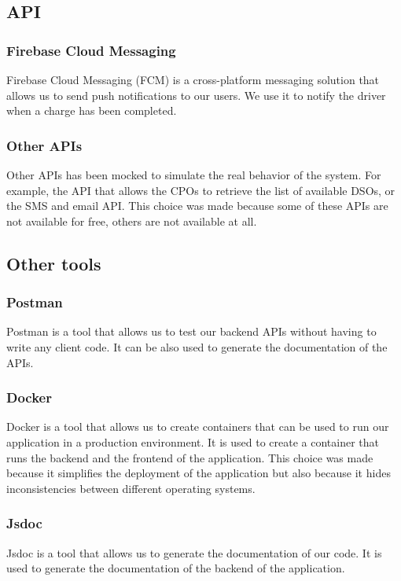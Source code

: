 \subsection{API}
\subsubsection{Firebase Cloud Messaging}
Firebase Cloud Messaging (FCM) is a cross-platform messaging solution that allows us to send push notifications to our users. We use it to notify the driver when a charge has been completed.

\subsubsection{Other APIs}
Other APIs has been mocked to simulate the real behavior of the system. For example, the API that allows the CPOs to retrieve the list of available DSOs, or the SMS and email API.
This choice was made because some of these APIs are not available for free, others are not available at all.

\subsection{Other tools}
\subsubsection{Postman}
Postman is a tool that allows us to test our backend APIs without having to write any client code. It can be also used to generate the documentation of the APIs.
\subsubsection{Docker}
Docker is a tool that allows us to create containers that can be used to run our application in a production environment. It is used to create a container that runs the backend and the frontend of the application.
This choice was made because it simplifies the deployment of the application but also because it hides inconsistencies between different operating systems.
\subsubsection{Jsdoc}
Jsdoc is a tool that allows us to generate the documentation of our code. It is used to generate the documentation of the backend of the application.


